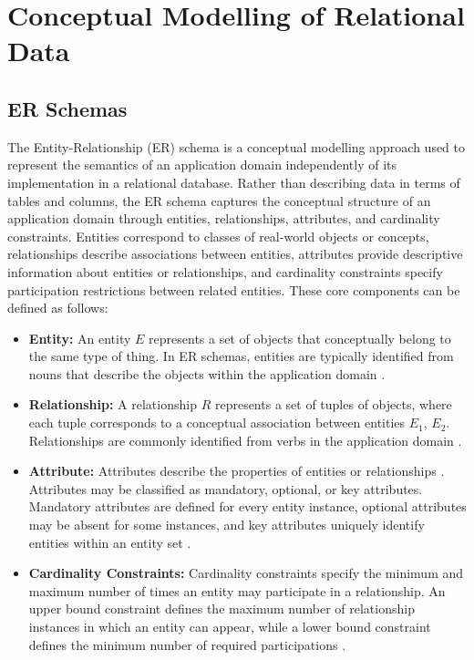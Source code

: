 \section{Conceptual Modelling of Relational Data}
\subsection{ER Schemas}
The Entity-Relationship (ER) schema is a conceptual modelling approach used to represent the semantics of an application domain independently of its implementation in a relational database. Rather than describing data in terms of tables and columns, the ER schema captures the conceptual structure of an application domain through entities, relationships, attributes, and cardinality constraints. Entities correspond to classes of real-world objects or concepts, relationships describe associations between entities, attributes provide descriptive information about entities or relationships, and cardinality constraints specify participation restrictions between related entities. These core components can be defined as follows:

\begin{itemize}
    \item \textbf{Entity:} An entity $E$ represents a set of objects that conceptually belong to the same type of thing. In ER schemas, entities are typically identified from nouns that describe the objects within the application domain \cite{mcbrien_er_modelling}.

    \item \textbf{Relationship:} A relationship $R$ represents a set of tuples of objects, where each tuple corresponds to a conceptual association between entities $E_1$, $E_2$. Relationships are commonly identified from verbs in the application domain \cite{mcbrien_er_modelling}.

    \item \textbf{Attribute:} Attributes describe the properties of entities or relationships \cite{ware2004information}. Attributes may be classified as mandatory, optional, or key attributes. Mandatory attributes are defined for every entity instance, optional attributes may be absent for some instances, and key attributes uniquely identify entities within an entity set \cite{mcbrien_er_modelling}.

    \item \textbf{Cardinality Constraints:} Cardinality constraints specify the minimum and maximum number of times an entity may participate in a relationship. An upper bound constraint defines the maximum number of relationship instances in which an entity can appear, while a lower bound constraint defines the minimum number of required participations \cite{mcbrien_er_modelling}.
\end{itemize}


